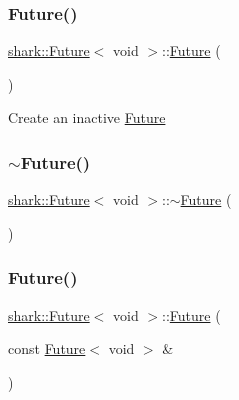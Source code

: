\hypertarget{structshark_1_1_future_3_01void_01_4_a9d9ba1fd13888e20745b8db129ae59e3}{}\label{structshark_1_1_future_3_01void_01_4_a9d9ba1fd13888e20745b8db129ae59e3} 
\subsubsection{\texorpdfstring{Future()}{Future()}\hspace{0.1cm}{\footnotesize\ttfamily [2/4]}}
{\footnotesize\ttfamily \hyperlink{structshark_1_1_future}{shark\+::\+Future}$<$ void $>$\+::\hyperlink{structshark_1_1_future}{Future} (\begin{DoxyParamCaption}{ }\end{DoxyParamCaption})}

Create an inactive \hyperlink{structshark_1_1_future}{Future} \hypertarget{structshark_1_1_future_3_01void_01_4_a07e736f76c27ca4ee5c8f7ce09d9f7a4}{}\label{structshark_1_1_future_3_01void_01_4_a07e736f76c27ca4ee5c8f7ce09d9f7a4} 
\subsubsection{\texorpdfstring{$\sim$\+Future()}{~Future()}}
{\footnotesize\ttfamily \hyperlink{structshark_1_1_future}{shark\+::\+Future}$<$ void $>$\+::$\sim$\hyperlink{structshark_1_1_future}{Future} (\begin{DoxyParamCaption}{ }\end{DoxyParamCaption})}

\hypertarget{structshark_1_1_future_3_01void_01_4_ab1d9ff8c5185ea0b9c1d738a1e17154c}{}\label{structshark_1_1_future_3_01void_01_4_ab1d9ff8c5185ea0b9c1d738a1e17154c} 
\subsubsection{\texorpdfstring{Future()}{Future()}\hspace{0.1cm}{\footnotesize\ttfamily [3/4]}}
{\footnotesize\ttfamily \hyperlink{structshark_1_1_future}{shark\+::\+Future}$<$ void $>$\+::\hyperlink{structshark_1_1_future}{Future} (\begin{DoxyParamCaption}\item[{const \hyperlink{structshark_1_1_future}{Future}$<$ void $>$ \&}]{ }\end{DoxyParamCaption})\hspace{0.3cm}{\ttfamily [delete]}}

